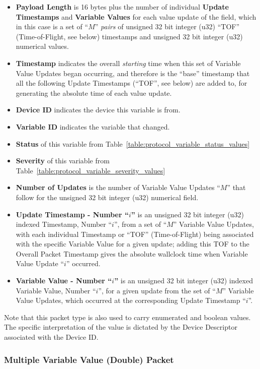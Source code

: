 \begin{itemize}
\item{\bf Payload Length} is 16 bytes plus the number
of individual {\bf Update Timestamps} and {\bf Variable Values}
for each value update of the field,
which in this case is a set of ``$M$'' {\it pairs} of
unsigned 32 bit integer (u32) ``TOF'' (Time-of-Flight, see below)
timestamps
and unsigned 32 bit integer (u32) numerical values.
\item{\bf Timestamp} indicates the overall {\it starting} time when
this set of Variable Value Updates began occurring,
and therefore is the ``base'' timestamp that
all the following Update Timestamps (``TOF'', see below)
are added to, for generating the absolute time of each value update.
\item{\bf Device ID} indicates the device this variable is from.
\item{\bf Variable ID} indicates the variable that changed.
\item{\bf Status} of this variable from
Table~\ref{table:protocol_variable_status_values}
\item{\bf Severity} of this variable from
Table~\ref{table:protocol_variable_severity_values}
\item{\bf Number of Updates}
is the number of Variable Value Updates ``$M$''
that follow for the unsigned 32 bit integer (u32) numerical field.
\item{\bf Update Timestamp - Number ``$i$''} is an
unsigned 32 bit integer (u32) indexed Timestamp, Number ``$i$'',
from a set of ``$M$'' Variable Value Updates,
with each individual Timestamp or ``TOF'' (Time-of-Flight)
being associated with the specific Variable Value for a given update;
adding this TOF to the Overall Packet Timestamp gives the
absolute wallclock time when Variable Value Update ``$i$'' occurred.
\item{\bf Variable Value - Number ``$i$''} is an
unsigned 32 bit integer (u32) indexed Variable Value, Number ``$i$'',
for a given update from the set of ``$M$'' Variable Value Updates,
which occurred at the corresponding Update Timestamp ``$i$''.
\end{itemize}

Note that this packet type is also used to carry enumerated and boolean values.
The specific interpretation of the value is dictated by the Device Descriptor
associated with the Device ID.


\newpage
\subsubsection{Multiple Variable Value (Double) Packet}
\label{section:protocol_mult_variable_value_double}

